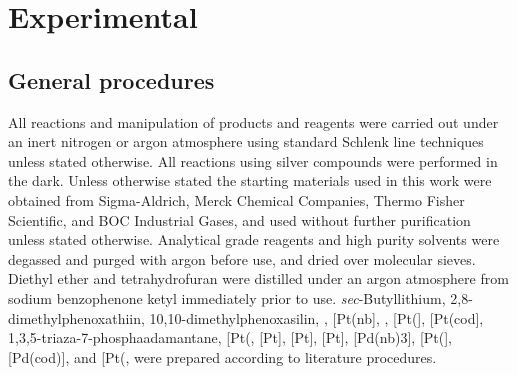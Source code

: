 
\chapter{Experimental}
\label{ch:expt}

\section{General procedures}
\label{section:generalprocedures}

\setlength{\emergencystretch}{2pt}

\begin{sloppypar}
All reactions and manipulation of products and reagents were carried out under an inert nitrogen or argon atmosphere using standard Schlenk line techniques unless stated otherwise.  All reactions using silver compounds were performed in the dark.  Unless otherwise stated the starting materials used in this work were obtained from Sigma-Aldrich, Merck Chemical Companies, Thermo Fisher Scientific, and BOC Industrial Gases, and used without further purification unless stated otherwise.  Analytical grade reagents and high purity solvents were degassed and purged with argon before use, and dried over molecular sieves.  Diethyl ether and tetrahydrofuran were distilled under an argon atmosphere from sodium benzophenone ketyl immediately prior to use.  
\emph{sec}-Butyllithium,\cite{Dieter2001} 
2,8-di\-methyl\-phenoxathiin,\cite{Suter1938} 
10,10-dimethyl\-phenoxasilin,\cite{Kranenburg1995} 
,\cite{Koshar1973} 
[Pt(nb],\cite{Vaughan2011}
,\cite{Giordano1979}
 [Pt(],\cite{Spencer1979} 
[Pt(cod],\cite{Crascall1990} 
1,3,5-triaza-7-phosphaadamantane,\cite{Daigle1998a} 
[Pt(\ce{C6H10)Cl2]},\cite{Jensen1953} 
[Pt],\cite{Albrecht2000} 
[Pt],\cite{Hartley1979} 
[Pt],\cite{Cramer1967}
[Pd(nb{)3}]\cite{Green1977}, 
[Pt(],\cite{Bradthesis}
[Pd(cod)],
and [Pt(\ce{C6H10)Me2]},\cite{Vaughan2011}
were prepared according to literature procedures.  
\end{sloppypar}

